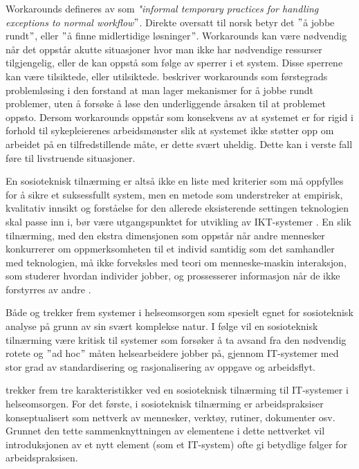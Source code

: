 \noindent
Workarounds defineres av \citet{Kobayashi05} som \emph{"informal temporary practices for handling exceptions to normal workflow$"$}. Direkte oversatt til norsk betyr det $"$å jobbe rundt$"$, eller $"$å finne midlertidige løsninger$"$.
Workarounds kan være nødvendig når det oppstår akutte situasjoner hvor man ikke har nødvendige ressurser tilgjengelig, eller de kan oppstå som følge av sperrer i et system. Disse sperrene kan være tilsiktede, eller utilsiktede. \citet{Vogelsmeier08} beskriver workarounds som førstegrads problemløsing i den forstand at man lager mekanismer for å jobbe rundt problemer, uten å forsøke å løse den underliggende årsaken til at problemet oppsto. Dersom workarounds oppstår som konsekvens av at systemet er for rigid i forhold til sykepleierenes arbeidsmønster slik at systemet ikke støtter opp om arbeidet på en tilfredstillende måte, er dette svært uheldig. Dette kan i verste fall føre til livstruende situasjoner.

\noindent
En sosioteknisk tilnærming er altså ikke en liste med kriterier som må oppfylles for å sikre et suksessfullt system, men en metode som understreker at empirisk, kvalitativ innsikt og forståelse for den allerede eksisterende settingen teknologien skal passe inn i, bør være utgangspunktet for utvikling av IKT-systemer \citep{Berg99}. En slik tilnærming, med den ekstra dimensjonen som oppstår når andre mennesker konkurrerer om oppmerksomheten til et individ samtidig som det samhandler med teknologien, må ikke forveksles med teori om menneske-maskin interaksjon, som studerer hvordan individer jobber, og prossesserer informasjon når de ikke forstyrres av andre \citep{Coiera07}.

\noindent
Både \citet{Coiera07} og \citet{Berg99} trekker frem systemer i helseomsorgen som spesielt egnet for sosioteknisk analyse på grunn av sin svært komplekse natur. I følge \citet{Berg99} vil en sosioteknisk tilnærming være kritisk til systemer som forsøker å ta avsand fra den nødvendig rotete og $"$ad hoc$"$ måten helsearbeidere jobber på, gjennom IT-systemer med stor grad av standardisering og rasjonalisering av oppgave og arbeidsflyt.











\citet{Berg99} trekker frem tre karakteristikker ved en sosioteknisk tilnærming til IT-systemer i helseomsorgen. For det første, i sosioteknisk tilnærming er arbeidspraksiser konseptualisert som nettverk av mennesker, verktøy, rutiner, dokumenter osv. Grunnet den tette sammenknyttningen av elementene i dette nettverket vil introduksjonen av et nytt element (som et IT-system) ofte gi betydlige følger for arbeidspraksisen. 







